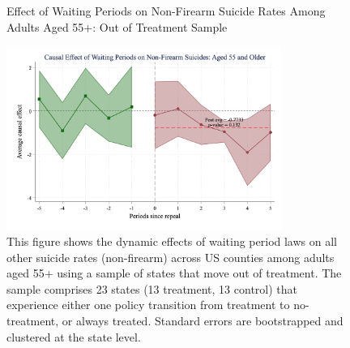 \begin{figure}[htbp]
    \centering
    \caption{Effect of Waiting Periods on Non-Firearm Suicide Rates Among Adults Aged 55+: Out of Treatment Sample}
    \label{fig:firearm_suicide_DID_other_age55plus-out}
    \includegraphics[width=0.8\textwidth]{figures/1014-csid-outsample-age_55p-other.png}
    \begin{minipage}{\linewidth}
    \caption*{\footnotesize{
    This figure shows the dynamic effects of waiting period laws on all other suicide rates (non-firearm) across US counties among adults aged 55+ using a sample of states that move out of treatment. The sample comprises 23 states (13 treatment, 13 control) that experience either one policy transition from treatment to no-treatment, or always treated. Standard errors are bootstrapped and clustered at the state level. }}
  \end{minipage}
\end{figure}

\pagebreak
\clearpage

